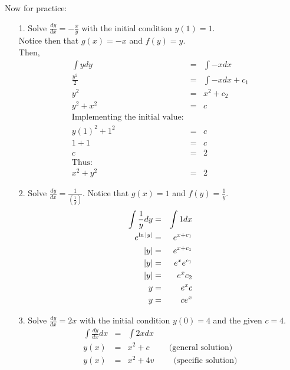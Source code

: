 \documentclass[10pt]{article}
\begin{document}
        Now for practice:
        \begin{enumerate}
            \item[1.] Solve $\frac{dy}{dx}=-\frac{x}{y}$ with the initial condition $y(1)=1$.\\
            Notice then that $g(x)=-x$ and $f(y)=y$.\\
            Then,
            \begin{eqnarray*}
                \int{ydy}&=&\int{-xdx}\\
                \frac{y^2}{2}&=&\int{-xdx}+c_1\\
                y^2&=&x^2+c_2\\
                y^2+x^2&=&c\\
                \text{Implementing the initial value:}\\
                y(1)^2+1^2&=&c\\
                1+1&=&c\\
                c&=&2\\
                \text{Thus:}\\
                x^2+y^2&=&2
            \end{eqnarray*}
    
            \item[2.] Solve $\frac{dy}{dx}=\frac{1}{(\frac{1}{y})}.$
            Notice that $g(x)=1$ and $f(y)=\frac{1}{y}$.\\
            \begin{eqnarray*}
                \int{\frac{1}{y}dy}&=&\int{1dx}\\
                e^{\ln{\mid{y}\mid}}&=&e^{x+c_1}\\
                \abs{y}&=&e^{x+c_1}\\
                \abs{y}&=&e^x e^{c_1}\\
                \abs{y}&=&e^x c_2\\
                y&=&e^x c\\
                y&=&ce^x
            \end{eqnarray*}
            
            \item[3.] Solve $\frac{dy}{dx}=2x$ with the initial condition $y(0)=4$ and the given $c=4$.\\
            \begin{eqnarray*}
                \int{\frac{dy}{dx}dx}&=&\int{2xdx}\\
                y(x)&=&x^2+c \hspace{1cm}\text{(general solution)}\\
                y(x)&=&x^2+4v\hspace{1cm}\text{(specific solution)}\\
            \end{eqnarray*}
        \end{enumerate}
    
\end{document}
